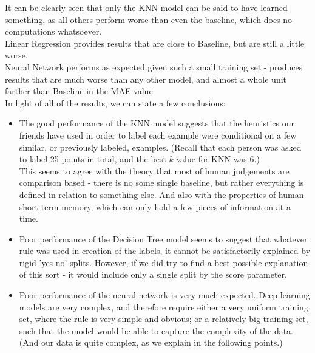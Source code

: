 \documentclass[11pt, oneside]{article}   	%
\begin{document}
It can be clearly seen that only the KNN model can be said to have learned something, as all others perform worse than even the baseline, which does no computations whatsoever.\\
Linear Regression provides results that are close to Baseline, but are still a little worse.\\
Neural Network performs as expected given such a small training set - produces results that are much worse than any other model, and almost a whole unit farther than Baseline in the MAE value.\\

In light of all of the results, we can state a few conclusions:
\begin{itemize}
    \item The good performance of the KNN model suggests that the heuristics our friends have used in order to label each example were conditional on a few similar, or previously labeled, examples. (Recall that each person was asked to label 25 points in total, and the best $k$ value for KNN was 6.)\\ This seems to agree with the theory that most of human judgements are comparison based - there is no some single baseline, but rather everything is defined in relation to something else. And also with the properties of human short term memory, which can only hold a few pieces of information at a time.
    \item Poor performance of the Decision Tree model seems to suggest that whatever rule was used in creation of the labels, it cannot be satisfactorily explained by rigid 'yes-no' splits. However, if we did try to find a best possible explanation of this sort - it would include only a single split by the score parameter.
    \item Poor performance of the neural network is very much expected. Deep learning models are very complex, and therefore require either a very uniform training set, where the rule is very simple and obvious; or a relatively big training set, such that the model would be able to capture the complexity of the data. (And our data is quite complex, as we explain in the following points.)
\end{itemize}
\end{document}
